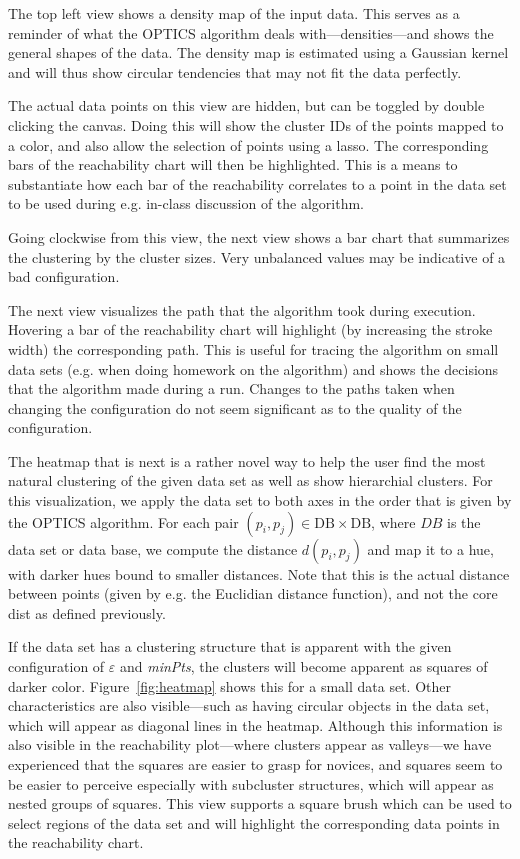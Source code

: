 \documentclass{vgtc}                          %
\begin{document}
The top left view shows a density map of the input data. This serves as a reminder
of what the OPTICS algorithm deals with---densities---and shows the general shapes of
the data. The density map is estimated using a Gaussian kernel and will thus show
circular tendencies that may not fit the data perfectly.

The actual data points on this view are hidden, but can be toggled by double clicking
the canvas. Doing this will show the cluster IDs of the points mapped to a color, and
also allow the selection of points using a lasso. The corresponding bars of the reachability
chart will then be highlighted. This is a means to substantiate how each bar of the
reachability correlates to a point in the data set to be used during e.g. in-class
discussion of the algorithm.

Going clockwise from this view, the next view shows a bar chart that summarizes the
clustering by the cluster sizes. Very unbalanced values may be indicative of a bad
configuration.

The next view visualizes the path that the algorithm took during execution.
Hovering a bar of the reachability chart will highlight (by increasing the
stroke width) the corresponding path. This is useful for tracing the algorithm
on small data sets (e.g. when doing homework on the algorithm) and shows the
decisions that the algorithm made during a run. Changes to the paths taken when
changing the configuration do not seem significant as to the quality of the
configuration.

The heatmap that is next is a rather novel way to help the user find the most
natural clustering of the given data set as well as show hierarchial clusters.
For this visualization, we apply the data set to both axes in the order that is
given by the OPTICS algorithm. For each pair $(p_i, p_j) \in \text{DB} \times
\text{DB}$, where $DB$ is the data set or data base, we compute the distance
$d(p_i, p_j)$ and map it to a hue, with darker hues bound to smaller distances.
Note that this is the actual distance between points (given by e.g. the
Euclidian distance function), and not the core dist as defined previously.

If the data set has a clustering structure that is apparent with the given
configuration of $\varepsilon$ and \emph{minPts}, the clusters will become
apparent as squares of darker color. Figure~\ref{fig:heatmap} shows this for a
small data set. Other characteristics are also visible---such as having
circular objects in the data set, which will appear as diagonal lines in the
heatmap. Although this information is also visible in the reachability
plot---where clusters appear as valleys---we have experienced that the squares
are easier to grasp for novices, and squares seem to be easier to perceive
especially with subcluster structures, which will appear as nested groups of
squares. This view supports a square brush which can be used to select regions
of the data set and will highlight the corresponding data points in the
reachability chart.
\end{document}
